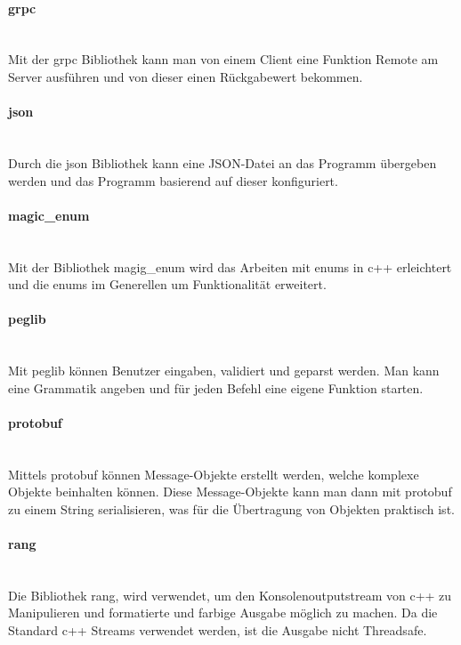 \paragraph{grpc} \mbox{} \vspace{2mm} \\
Mit der grpc Bibliothek kann man von einem Client eine Funktion Remote am Server ausführen und von dieser einen Rückgabewert bekommen.

\paragraph{json} \mbox{} \vspace{2mm} \\
Durch die json Bibliothek kann eine JSON-Datei an das Programm übergeben werden und das Programm basierend auf dieser konfiguriert.

\paragraph{magic\_enum} \mbox{} \vspace{2mm} \\
Mit der Bibliothek magig\_enum wird das Arbeiten mit enums in c++ erleichtert und die enums im Generellen um Funktionalität erweitert.

\paragraph{peglib} \mbox{} \vspace{2mm} \\
Mit peglib können Benutzer eingaben, validiert und geparst werden. Man kann eine Grammatik angeben und für jeden Befehl eine eigene Funktion starten.

\paragraph{protobuf} \mbox{} \vspace{2mm} \\
Mittels protobuf können Message-Objekte erstellt werden, welche komplexe Objekte beinhalten können. Diese Message-Objekte kann man dann mit protobuf zu einem String serialisieren, was für die Übertragung von Objekten praktisch ist.

\paragraph{rang} \mbox{} \vspace{2mm} \\
Die Bibliothek rang, wird verwendet, um den Konsolenoutputstream von c++ zu Manipulieren und formatierte und farbige Ausgabe möglich zu machen. Da die Standard c++ Streams verwendet werden, ist die Ausgabe nicht Threadsafe.

